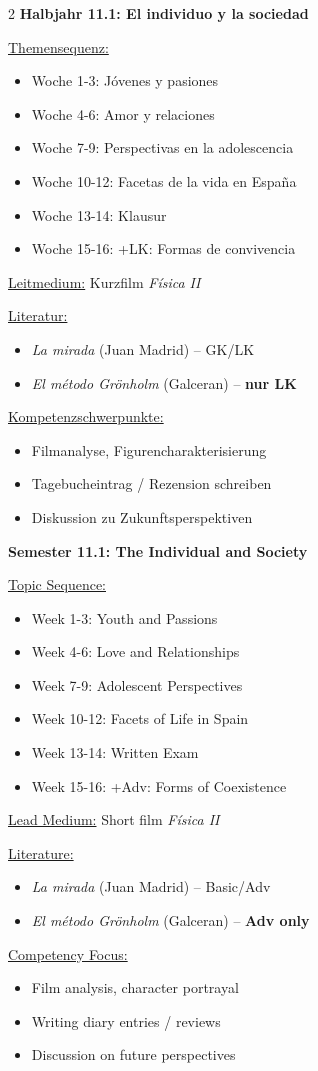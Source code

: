 \documentclass[10pt,a4paper]{article}
\newcommand{\bil}[2]{%
\begin{paracol}{2}
\small #1
\switchcolumn
\small\textcolor{english}{#2}
\end{paracol}
}
\begin{document}
\bil{%
\textbf{Halbjahr 11.1: El individuo y la sociedad}

\underline{Themensequenz:}
\begin{itemize}[noitemsep,topsep=2pt]
\item Woche 1-3: Jóvenes y pasiones
\item Woche 4-6: Amor y relaciones
\item Woche 7-9: Perspectivas en la adolescencia
\item Woche 10-12: Facetas de la vida en España
\item Woche 13-14: Klausur
\item Woche 15-16: +LK: Formas de convivencia
\end{itemize}

\underline{Leitmedium:} Kurzfilm \textit{Física II}

\underline{Literatur:}
\begin{itemize}[noitemsep,topsep=2pt]
\item \textit{La mirada} (Juan Madrid) -- GK/LK
\item \textit{El método Grönholm} (Galceran) -- \textbf{nur LK}
\end{itemize}

\underline{Kompetenzschwerpunkte:}
\begin{itemize}[noitemsep,topsep=2pt]
\item Filmanalyse, Figurencharakterisierung
\item Tagebucheintrag / Rezension schreiben
\item Diskussion zu Zukunftsperspektiven
\end{itemize}
}{%
\textbf{Semester 11.1: The Individual and Society}

\underline{Topic Sequence:}
\begin{itemize}[noitemsep,topsep=2pt]
\item Week 1-3: Youth and Passions
\item Week 4-6: Love and Relationships
\item Week 7-9: Adolescent Perspectives
\item Week 10-12: Facets of Life in Spain
\item Week 13-14: Written Exam
\item Week 15-16: +Adv: Forms of Coexistence
\end{itemize}

\underline{Lead Medium:} Short film \textit{Física II}

\underline{Literature:}
\begin{itemize}[noitemsep,topsep=2pt]
\item \textit{La mirada} (Juan Madrid) -- Basic/Adv
\item \textit{El método Grönholm} (Galceran) -- \textbf{Adv only}
\end{itemize}

\underline{Competency Focus:}
\begin{itemize}[noitemsep,topsep=2pt]
\item Film analysis, character portrayal
\item Writing diary entries / reviews
\item Discussion on future perspectives
\end{itemize}
}
\end{document}
